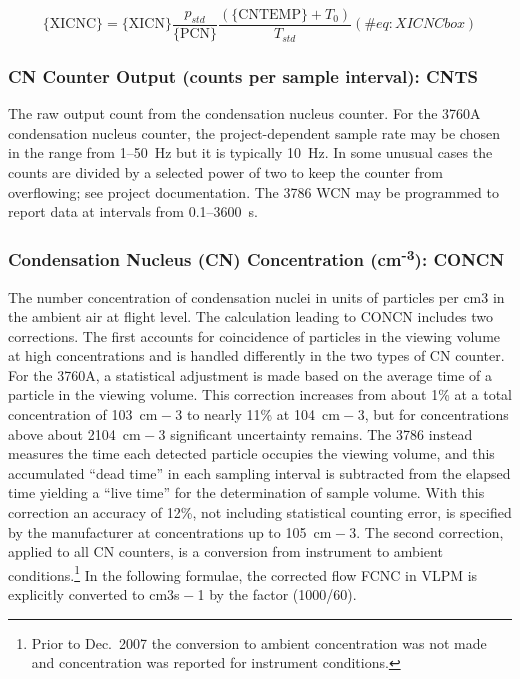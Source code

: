 \documentclass[
  english,
]{book}
\begin{document}
\begin{equation}
\mathrm{\{XICNC\} = \{XICN\}}\frac{p_{std}}{\mathrm{\{PCN\}}}\frac{(\{\mathrm{CNTEMP\}}+T_{0})}{T_{std}}
(\#eq:XICNCbox)
\end{equation}

\hypertarget{cnts}{%
\subsubsection*{CN Counter Output (counts per sample interval):
CNTS}\label{cnts}}

The raw output count from the condensation nucleus counter. For the
3760A condensation nucleus counter, the project-dependent sample rate
may be chosen in the range from 1--50~Hz but it is typically 10~Hz. In
some unusual cases the counts are divided by a selected power of two to
keep the counter from overflowing; see project documentation. The 3786
WCN may be programmed to report data at intervals from 0.1--3600~s.

\hypertarget{concn}{%
\subsubsection*{\texorpdfstring{Condensation Nucleus (CN) Concentration
(cm\textsuperscript{-3}):
CONCN}{Condensation Nucleus (CN) Concentration (cm-3): CONCN}}\label{concn}}

The number concentration of condensation nuclei in units of particles
per cm{3} in the ambient air at flight level. The calculation leading to
CONCN includes two corrections. The first accounts for coincidence of
particles in the viewing volume at high concentrations and is handled
differently in the two types of CN counter. For the 3760A, a statistical
adjustment is made based on the average time of a particle in the
viewing volume. This correction increases from about 1\% at a total
concentration of 10{3}~cm{ − 3} to nearly 11\% at 10{4}~cm{ − 3}, but
for concentrations above about 210{4}~cm{ − 3} significant uncertainty
remains. The 3786 instead measures the time each detected particle
occupies the viewing volume, and this accumulated ``dead time'' in each
sampling interval is subtracted from the elapsed time yielding a ``live
time'' for the determination of sample volume. With this correction an
accuracy of 12\%, not including statistical counting error, is specified
by the manufacturer at concentrations up to 10{5}~cm{ − 3}. The second
correction, applied to all CN counters, is a conversion from instrument
to ambient conditions.\footnote{Prior to Dec.~2007 the conversion to
  ambient concentration was not made and concentration was reported for
  instrument conditions.} In the following formulae, the corrected flow
FCNC in VLPM is explicitly converted to cm{3}s{ − 1} by the factor
(1000/60).
\end{document}
